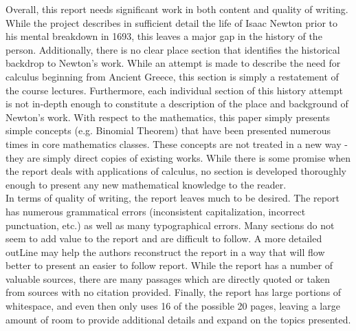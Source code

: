 \documentclass[11pt]{article}
\begin{document}
Overall, this report needs significant work in both content and quality of writing. While the project describes in sufficient detail the life of Isaac Newton prior to his mental breakdown in 1693, this leaves a major gap in the history of the person. Additionally, there is no clear place section that identifies the historical backdrop to Newton's work. While an attempt is made to describe the need for calculus beginning from Ancient Greece, this section is simply a restatement of the course lectures. Furthermore, each individual section of this history attempt is not in-depth enough to constitute a description of the place and background of Newton's work. With respect to the mathematics, this paper simply presents simple concepts (e.g. Binomial Theorem) that have been presented numerous times in core mathematics classes. These concepts are not treated in a new way - they are simply direct copies of existing works. While there is some promise when the report deals with applications of calculus, no section is developed thoroughly enough to present any new mathematical knowledge to the reader.\\

In terms of quality of writing, the report leaves much to be desired. The report has numerous grammatical errors (inconsistent capitalization, incorrect punctuation, etc.) as well as many typographical errors. Many sections do not seem to add value to the report and are difficult to follow. A more detailed outLine may help the authors reconstruct the report in a way that will flow better to present an easier to follow report. While the report has a number of valuable sources, there are many passages which are directly quoted or taken from sources with no citation provided. Finally, the report has large portions of whitespace, and even then only uses 16 of the possible 20 pages, leaving a large amount of room to provide additional details and expand on the topics presented.

\newpage
\end{document}
